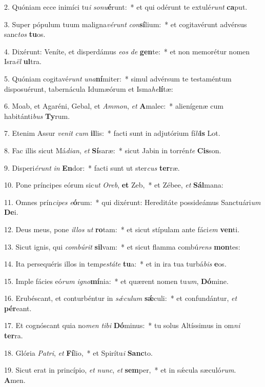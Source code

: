 2. Quóniam ecce inimíci tu\textit{i} \textit{so}\textit{nu}\textbf{é}runt:~*  et qui odérunt te extulé\textit{runt} \textbf{ca}put.\

3. Super pópulum tuum maligna\textit{vé}\textit{runt} \textit{con}\textbf{sí}lium:~*  et cogitavérunt advérsus sanc\textit{tos} \textbf{tu}os.\

4. Dixérunt: Veníte, et disperdámus \textit{e}\textit{os} \textit{de} \textbf{gen}te:~*  et non memorétur nomen Isra\textit{ël} \textbf{ul}tra.\

5. Quóniam cogitavé\textit{runt} \textit{u}\textit{na}\textbf{ní}miter:~*  simul advérsum te testaméntum disposuérunt, tabernácula Idumæórum et Isma\textit{he}\textbf{lí}tæ:\

6. Moab, et Agaréni, Gebal, et \textit{Am}\textit{mon}, \textit{et} \textbf{A}malec:~*  alienígenæ cum habitánti\textit{bus} \textbf{Ty}rum.\

7. Etenim Assur \textit{ve}\textit{nit} \textit{cum} \textbf{il}lis:~*  facti sunt in adjutórium fí\textit{li}\textbf{is} Lot.\

8. Fac illis sicut Má\textit{di}\textit{an}, \textit{et} \textbf{Sí}saræ:~*  sicut Jabin in torrén\textit{te} \textbf{Cis}son.\

9. Disperi\textit{é}\textit{runt} \textit{in} \textbf{En}dor:~*  facti sunt ut ster\textit{cus} \textbf{ter}ræ.\

10. Pone príncipes eórum sic\textit{ut} \textit{O}\textit{reb}, \textbf{et} Zeb,~*  et Zébee, \textit{et} \textbf{Sál}mana:\

11. Omnes prín\textit{ci}\textit{pes} \textit{e}\textbf{ó}rum:~*  qui dixérunt: Hereditáte possideámus Sanctuári\textit{um} \textbf{De}i.\

12. Deus meus, pone \textit{il}\textit{los} \textit{ut} \textbf{ro}tam:~*  et sicut stípulam ante fáci\textit{em} \textbf{ven}ti.\

13. Sicut ignis, qui \textit{com}\textit{bú}\textit{rit} \textbf{sil}vam:~*  et sicut flamma combú\textit{rens} \textbf{mon}tes:\

14. Ita persequéris illos in tem\textit{pes}\textit{tá}\textit{te} \textbf{tu}a:~*  et in ira tua turbá\textit{bis} \textbf{e}os.\

15. Imple fácies eó\textit{rum} \textit{i}\textit{gno}\textbf{mí}nia:~*  et quærent nomen tu\textit{um}, \textbf{Dó}mine.\

16. Erubéscant, et conturbéntur in \textit{sǽ}\textit{cu}\textit{lum} \textbf{sǽ}culi:~*  et confundántur, \textit{et} \textbf{pér}eant.\

17. Et cognóscant quia no\textit{men} \textit{ti}\textit{bi} \textbf{Dó}minus:~*  tu solus Altíssimus in om\textit{ni} \textbf{ter}ra.\

18. Glória \textit{Pa}\textit{tri}, \textit{et} \textbf{Fí}lio,~*  et Spirítu\textit{i} \textbf{Sanc}to.\

19. Sicut erat in princípio, \textit{et} \textit{nunc}, \textit{et} \textbf{sem}per,~*  et in sǽcula sæculó\textit{rum}. \textbf{A}men.\

